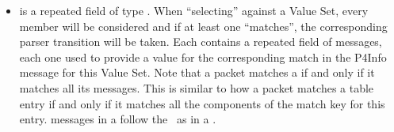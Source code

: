 \documentclass[11pt]{article}
\begin{document}
{\begin{itemize}
\item{}
 is a repeated field of type . When \textquotedblleft{}selecting\textquotedblright{}
against a Value Set, every member will be considered and if at least one
\textquotedblleft{}matches\textquotedblright{}, the corresponding parser transition will be taken. Each
 contains a repeated field of  messages, each one
used to provide a value for the corresponding match in the P4Info message for
this Value Set. Note that a packet matches a  if and only if
it matches all its  messages. This is similar to how a packet
matches a table entry if and only if it matches all the components of the
match key for this entry.  messages in a  follow
the~ as in a .%
\end{itemize}%

}
\end{document}

